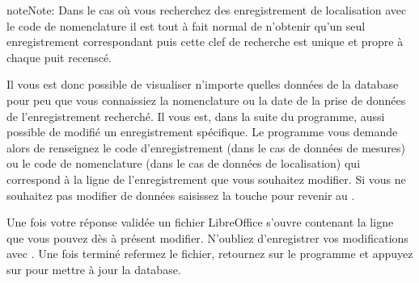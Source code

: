 \documentclass[letterpaper,10pt,french]{sphinxmanual}
\begin{document}
\begin{sphinxVerbatim}[commandchars=\\\{\}]
  
            
              
             
                 
              
     
\end{sphinxVerbatim}

\begin{sphinxadmonition}{note}{Note:}
\sphinxAtStartPar
Dans le cas où vous recherchez des enregistrement de localisation avec le code de nomenclature il est tout à fait normal de n’obtenir qu’un seul
enregistrement correspondant puis cette clef de recherche est unique et propre à chaque puit recenscé.
\end{sphinxadmonition}

\sphinxAtStartPar
Il vous est donc possible de visualiser n’importe quelles données de la database pour peu que vous connaissiez la nomenclature ou la date de la prise de données
de l’enregistrement recherché. Il vous est, dans la suite du programme, aussi possible de modifié un enregistrement spécifique.
Le programme vous demande alors de renseignez le code d’enregistrement  (dans le cas de données de mesures) ou le code de nomenclature 
(dans le cas de données de localisation) qui correspond à la ligne de l’enregistrement que vous souhaitez modifier. Si vous ne souhaitez pas modifier de données saisissez
la touche  pour revenir au .

\sphinxAtStartPar
Une fois votre réponse validée un fichier LibreOffice
s’ouvre contenant la ligne que vous pouvez dès à présent modifier. N’oubliez d’enregistrer vos modifications avec . Une fois terminé refermez le fichier, retournez
sur le programme et appuyez sur  pour mettre à jour la database.
\end{document}
